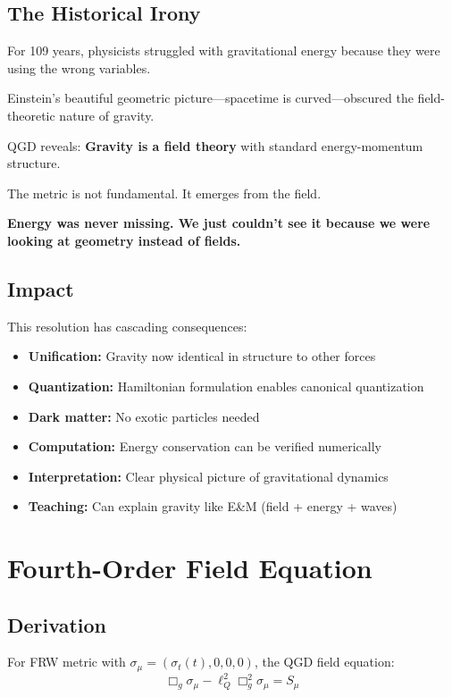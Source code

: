 \documentclass[11pt,a4paper]{article}
\theoremstyle{definition}
\theoremstyle{remark}
\begin{document}
	\subsection{The Historical Irony}
	
	For 109 years, physicists struggled with gravitational energy because they were using the wrong variables.
	
	Einstein's beautiful geometric picture—spacetime is curved—obscured the field-theoretic nature of gravity.
	
	QGD reveals: \textbf{Gravity is a field theory} with standard energy-momentum structure.
	
	The metric is not fundamental. It emerges from the field.
	
	\textbf{Energy was never missing. We just couldn't see it because we were looking at geometry instead of fields.}
	
	\subsection{Impact}
	
	This resolution has cascading consequences:
	
	\begin{itemize}
		\item \textbf{Unification:} Gravity now identical in structure to other forces
		\item \textbf{Quantization:} Hamiltonian formulation enables canonical quantization
		\item \textbf{Dark matter:} No exotic particles needed
		\item \textbf{Computation:} Energy conservation can be verified numerically
		\item \textbf{Interpretation:} Clear physical picture of gravitational dynamics
		\item \textbf{Teaching:} Can explain gravity like E\&M (field + energy + waves)
	\end{itemize}
	
	\section{Fourth-Order Field Equation}
	
	\subsection{Derivation}
	
	For FRW metric with $\sigma_\mu = (\sigma_t(t), 0, 0, 0)$, the QGD field equation:
	\begin{equation}
		\Box_g\sigma_\mu - \ell_Q^2\Box_g^2\sigma_\mu = S_\mu
	\end{equation}
	
\end{document}
